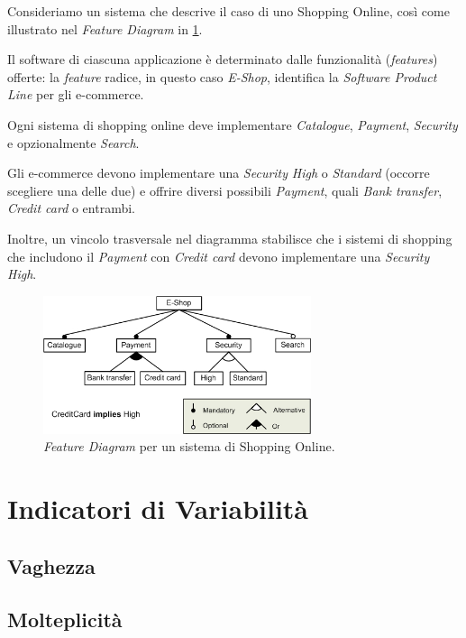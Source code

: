 \documentclass[12pt]{report}
\begin{document}
\begin{mdframed}
\small
Consideriamo un sistema che descrive il caso di uno \textsf{Shopping Online}, così come illustrato nel \textit{Feature Diagram} in \cref{fig:diagramma}.

Il software di ciascuna applicazione è determinato dalle funzionalità (\textit{features}) offerte: la \textit{feature} radice, in questo caso \textit{E-Shop}, identifica la \textit{Software Product Line} per gli e-commerce.

Ogni sistema di shopping online deve implementare \textit{Catalogue}, \textit{Payment}, \textit{Security} e opzionalmente \textit{Search}.

Gli e-commerce devono implementare una \textit{Security} \textit{High} o \textit{Standard} (occorre scegliere una delle due) e offrire diversi possibili \textit{Payment}, quali \textit{Bank transfer}, \textit{Credit card} o entrambi.

Inoltre, un vincolo trasversale nel diagramma stabilisce che i sistemi di shopping che includono il \textit{Payment} con \textit{Credit card} devono implementare una \textit{Security} \textit{High}.

\begin{figure}[H]
\centering
\includegraphics[width=0.7\textwidth]{diagramma.png}
\caption{\textit{Feature Diagram} per un sistema di Shopping Online.}
\label{fig:diagramma}
\end{figure}
\end{mdframed}


\section{Indicatori di Variabilità}  %
\subsection{Vaghezza}
\subsection{Molteplicità}
\end{document}
